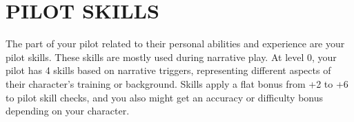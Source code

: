 \section{PILOT SKILLS}

The part of your pilot related to their personal abilities and experience are your pilot skills. These
skills are mostly used during narrative play. At level 0, your pilot has 4 skills based on narrative
triggers, representing different aspects of their character’s training or background. Skills apply a
flat bonus from +2 to +6 to pilot skill checks, and you also might get an accuracy or difficulty
bonus depending on your character.